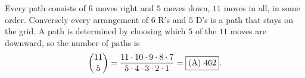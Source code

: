 Every path consists of $6$ moves right and $5$ moves down, $11$ moves in all, in some order. Conversely every arrangement of $6$ R's and $5$ D's is a path that stays on the grid. A path is determined by choosing which $5$ of the $11$ moves are downward, so the number of paths is
\[
\dbinom{11}{5}=\dfrac{11\cdot10\cdot9\cdot8\cdot7}{5\cdot4\cdot3\cdot2\cdot1}=\boxed{\text{(A) }462}.
\]
